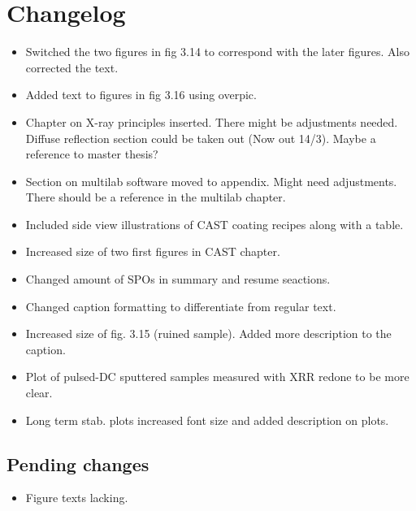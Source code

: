 \chapter{Changelog}

\begin{itemize}
  \item Switched the two figures in fig 3.14 to correspond with the later figures. Also corrected the text.
  \item Added text to figures in fig 3.16 using overpic.
  \item Chapter on X-ray principles inserted. There might be adjustments needed. Diffuse reflection section could be taken out (Now out 14/3). Maybe a reference to master thesis?
  \item Section on multilab software moved to appendix. Might need adjustments. There should be a reference in the multilab chapter.
  \item Included side view illustrations of CAST coating recipes along with a table.
  \item Increased size of two first figures in CAST chapter.
  \item Changed amount of SPOs in summary and resume seactions.
  \item Changed caption formatting to differentiate from regular text.
  \item Increased size of fig. 3.15 (ruined sample). Added more description to the caption.
  \item Plot of pulsed-DC sputtered samples measured with XRR redone to be more clear.
  \item Long term stab. plots increased font size and added description on plots.
\end{itemize}

\section{Pending changes}
\begin{itemize}
\item Figure texts lacking.
\end{itemize}
